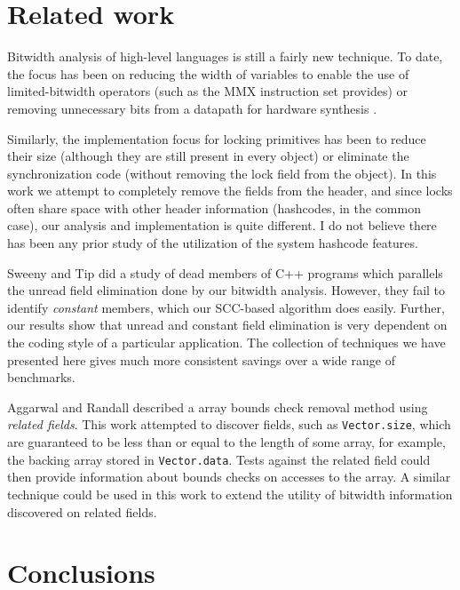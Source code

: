\documentclass[preprint]{acmconf}
\begin{document}
\section{Related work}


Bitwidth analysis of high-level languages is still a fairly new
technique.  To date, the focus has been on
reducing the width of variables to enable the use of limited-bitwidth
operators (such as the MMX instruction set provides)
or removing unnecessary bits from a datapath for
hardware synthesis \cite{stephenson00,ananian:siliconc}.

Similarly, the implementation focus for locking primitives has been to
reduce their size \cite{bacon98} (although they are still present in
every object) or eliminate the synchronization code
\cite{salcianu01} (without removing the lock field from the object).
In this work we attempt to completely remove the fields from the
header, and since locks often share space with other
header information (hashcodes, in the common case), our analysis and
implementation is quite different.  I do not believe there has been
any prior study of the utilization of the system hashcode features.

Sweeny and Tip \cite{SweeneyTip98DeadDataMembers} did a study of dead
members of C++ programs which parallels the unread field
elimination done by our bitwidth analysis.  However, they
fail to identify {\it constant} members, which our SCC-based algorithm
does easily.  Further, our results show that unread and constant field
elimination is very dependent on the coding style of a particular
application.  The collection of techniques we have presented here
gives much more consistent savings over a wide range of benchmarks.

Aggarwal and Randall \cite{aggarwal01} described a array bounds check
removal method using {\it related fields}.  This work attempted to
discover fields, such as {\tt Vector.size}, which are guaranteed to be
less than or equal to the length of some array, for example, the
backing array stored in {\tt Vector.data}.  Tests against the related
field could then provide information about bounds checks on accesses
to the array.  A similar technique could be used in this work to
extend the utility of bitwidth information discovered on related fields.


\section{Conclusions}



%
\end{document}
